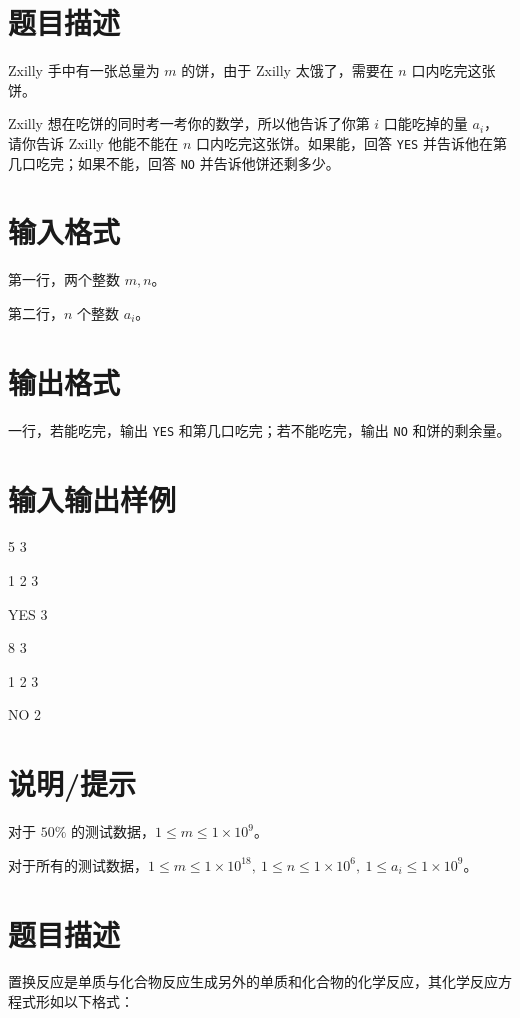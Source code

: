 \documentclass{../cpct/ctpro}
\begin{document}
\makeproblem
\section*{题目描述}

Zxilly 手中有一张总量为 $m$ 的饼，由于 Zxilly 太饿了，需要在 $n$ 口内吃完这张饼。

Zxilly 想在吃饼的同时考一考你的数学，所以他告诉了你第 $i$ 口能吃掉的量 $a_i$，请你告诉 Zxilly 他能不能在 $n$ 口内吃完这张饼。如果能，回答 \texttt{YES} 并告诉他在第几口吃完；如果不能，回答 \texttt{NO} 并告诉他饼还剩多少。

\section*{输入格式}

第一行，两个整数 $m,n$。

第二行，$n$ 个整数 $a_i$。

\section*{输出格式}

一行，若能吃完，输出 \texttt{YES} 和第几口吃完；若不能吃完，输出 \texttt{NO} 和饼的剩余量。

\section*{输入输出样例}

\testcasetab
{
    5 3 \par
    1 2 3
}
{
    YES 3
}

\testcasetab
{
    8 3 \par
    1 2 3
}
{
    NO 2
}

\section*{说明/提示}

对于 $50 \%$ 的测试数据，$1 \leq m \leq 1 \times {10}^9$。

对于所有的测试数据，$1 \leq m \leq 1 \times {10}^{18},~1 \leq n \leq 1 \times {10}^6,~1 \leq a_i \leq 1 \times {10}^9$。

\makeproblem
\section*{题目描述}

置换反应是单质与化合物反应生成另外的单质和化合物的化学反应，其化学反应方程式形如以下格式：
\end{document}
